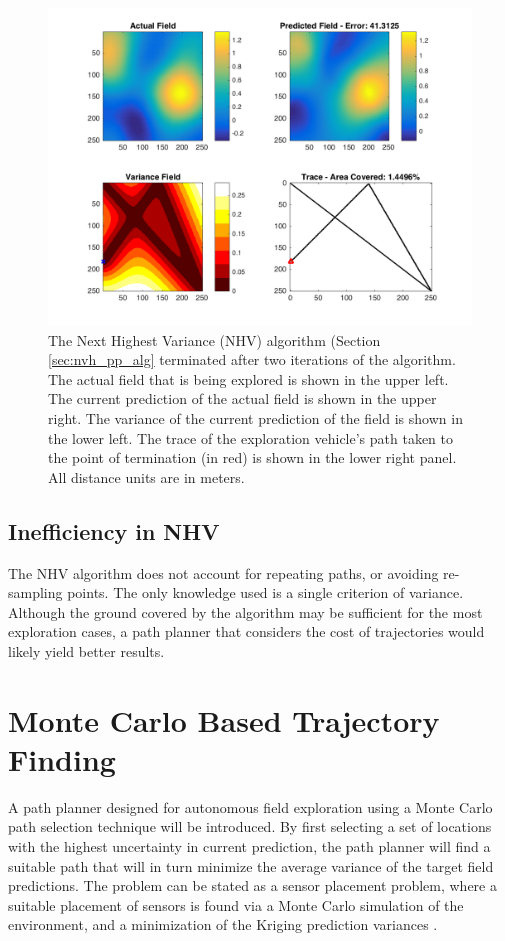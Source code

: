 \begin{figure}[hb!]
	\centering
	\includegraphics[width=0.95\linewidth]{figures/nhv_4panel.png}
    \captionsetup{skip=0.20\baselineskip}
	\ssp
	\caption{The Next Highest Variance (NHV) algorithm (Section \ref{sec:nvh_pp_alg} terminated after two iterations of the algorithm. The actual field that is being explored is shown in the upper left. The current prediction of the actual field is shown in the upper right. The variance of the current prediction of the field is shown in the lower left. The trace of the exploration vehicle's path taken to the point of termination (in red) is shown in the lower right panel. All distance units are in meters.}
	\label{fig:nhv_pp}
\end{figure}

\subsection{Inefficiency in NHV}
The NHV algorithm does not account for repeating paths, or avoiding re-sampling points. The only knowledge used is a single criterion of variance. Although the ground covered by the algorithm may be sufficient for the most exploration cases, a path planner that considers the cost of trajectories would likely yield better results.

\section{Monte Carlo Based Trajectory Finding} \label{sec:mcpp}
A path planner designed for autonomous field exploration using a Monte Carlo path selection technique will be introduced. By first selecting a set of locations with the highest uncertainty in current prediction, the path planner will find a suitable path that will in turn minimize the average variance of the target field predictions. The problem can be stated as a sensor placement problem, where a suitable placement of sensors is found via a Monte Carlo simulation of the environment, and a minimization of the Kriging prediction variances \cite{kriging:sensorplacement}.


